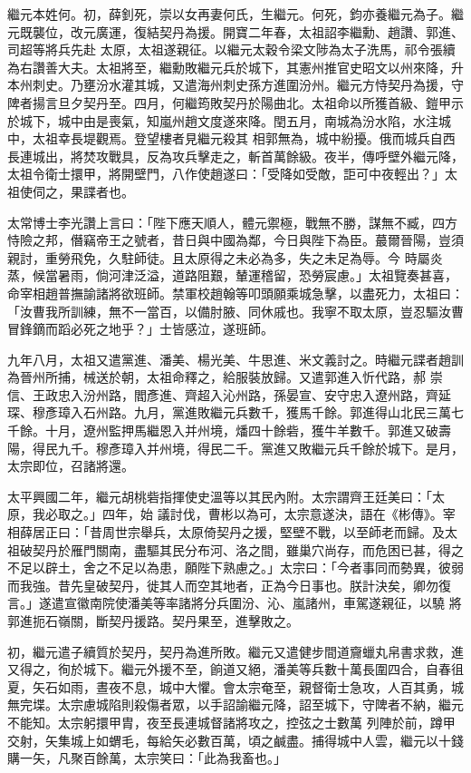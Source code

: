 \begin{pinyinscope}
 繼元本姓何。初，薛釗死，崇以女再妻何氏，生繼元。何死，鈞亦養繼元為子。繼元既襲位，改元廣運，復結契丹為援。開寶二年春，太祖詔李繼勳、趙讚、郭進、司超等將兵先赴
 太原，太祖遂親征。以繼元太穀令梁文陟為太子洗馬，祁令張續為右讚善大夫。太祖將至，繼勳敗繼元兵於城下，其憲州推官史昭文以州來降，升本州刺史。乃壅汾水灌其城，又遣海州刺史孫方進圍汾州。繼元方恃契丹為援，守陴者揚言旦夕契丹至。四月，何繼筠敗契丹於陽曲北。太祖命以所獲首級、鎧甲示於城下，城中由是喪氣，知嵐州趙文度遂來降。閏五月，南城為汾水陷，水注城中，太祖幸長堤觀焉。登望樓者見繼元殺其
 相郭無為，城中紛擾。俄而城兵自西長連城出，將焚攻戰具，反為攻兵擊走之，斬首萬餘級。夜半，傳呼壁外繼元降，太祖令衛士擐甲，將開壁門，八作使趙遂曰：「受降如受敵，詎可中夜輕出？」太祖使伺之，果諜者也。



 太常博士李光讚上言曰：「陛下應天順人，體元禦極，戰無不勝，謀無不臧，四方恃險之邦，僭竊帝王之號者，昔日與中國為鄰，今日與陛下為臣。蕞爾晉陽，豈須親討，重勞飛免，久駐師徒。且太原得之未必為多，失之未足為辱。今
 時屬炎蒸，候當暑雨，倘河津泛溢，道路阻艱，輦運稽留，恐勞宸慮。」太祖覽奏甚喜，命宰相趙普撫諭諸將欲班師。禁軍校趙翰等叩頭願乘城急擊，以盡死力，太祖曰：「汝曹我所訓練，無不一當百，以備肘腋、同休戚也。我寧不取太原，豈忍驅汝曹冒鋒鏑而蹈必死之地乎？」士皆感泣，遂班師。



 九年八月，太祖又遣黨進、潘美、楊光美、牛思進、米文義討之。時繼元諜者趙訓為晉州所捕，械送於朝，太祖命釋之，給服裝放歸。又遣郭進入忻代路，郝
 崇信、王政忠入汾州路，閻彥進、齊超入沁州路，孫晏宣、安守忠入遼州路，齊延琛、穆彥璋入石州路。九月，黨進敗繼元兵數千，獲馬千餘。郭進得山北民三萬七千餘。十月，遼州監押馬繼恩入并州境，燔四十餘砦，獲牛羊數千。郭進又破壽陽，得民九千。穆彥璋入并州境，得民二千。黨進又敗繼元兵千餘於城下。是月，太宗即位，召諸將還。



 太平興國二年，繼元胡桃砦指揮使史溫等以其民內附。太宗謂齊王廷美曰：「太原，我必取之。」四年，始
 議討伐，曹彬以為可，太宗意遂決，語在《彬傳》。宰相薛居正曰：「昔周世宗舉兵，太原倚契丹之援，堅壁不戰，以至師老而歸。及太祖破契丹於雁門關南，盡驅其民分布河、洛之間，雖巢穴尚存，而危困已甚，得之不足以辟土，舍之不足以為患，願陛下熟慮之。」太宗曰：「今者事同而勢異，彼弱而我強。昔先皇破契丹，徙其人而空其地者，正為今日事也。朕計決矣，卿勿復言。」遂遣宣徽南院使潘美等率諸將分兵圍汾、沁、嵐諸州，車駕遂親征，以驍
 將郭進扼石嶺關，斷契丹援路。契丹果至，進擊敗之。



 初，繼元遣子續質於契丹，契丹為進所敗。繼元又遣健步間道齎蠟丸帛書求救，進又得之，徇於城下。繼元外援不至，餉道又絕，潘美等兵數十萬長圍四合，自春徂夏，矢石如雨，晝夜不息，城中大懼。會太宗奄至，親督衛士急攻，人百其勇，城無完堞。太宗慮城陷則殺傷者眾，以手詔諭繼元降，詔至城下，守陴者不納，繼元不能知。太宗躬擐甲胄，夜至長連城督諸將攻之，控弦之士數萬
 列陣於前，蹲甲交射，矢集城上如蝟毛，每給矢必數百萬，頃之鹹盡。捕得城中人雲，繼元以十錢購一矢，凡聚百餘萬，太宗笑曰：「此為我畜也。」




\end{pinyinscope}

